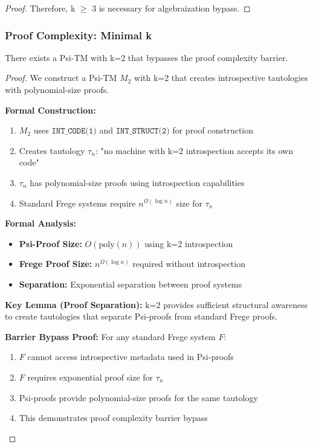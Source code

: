 \documentclass[11pt]{article}
\begin{document}
\begin{proof}
Therefore, k $\geq$ 3 is necessary for algebraization bypass.
\end{proof}

\subsubsection{Proof Complexity: Minimal k}

\begin{theorem}[Proof Complexity Bypass with k=2]
\label{thm:proof-complexity-k2}
There exists a Psi-TM with k=2 that bypasses the proof complexity barrier.
\end{theorem}

\begin{proof}
We construct a Psi-TM $M_2$ with k=2 that creates introspective tautologies with polynomial-size proofs.

\textbf{Formal Construction:}
\begin{enumerate}
\item $M_2$ uses $\texttt{INT\_CODE(1)}$ and $\texttt{INT\_STRUCT(2)}$ for proof construction
\item Creates tautology $\tau_n$: "no machine with k=2 introspection accepts its own code"
\item $\tau_n$ has polynomial-size proofs using introspection capabilities
\item Standard Frege systems require $n^{\Omega(\log n)}$ size for $\tau_n$
\end{enumerate}

\textbf{Formal Analysis:}
\begin{itemize}
\item \textbf{Psi-Proof Size:} $O(\text{poly}(n))$ using k=2 introspection
\item \textbf{Frege Proof Size:} $n^{\Omega(\log n)}$ required without introspection
\item \textbf{Separation:} Exponential separation between proof systems
\end{itemize}

\textbf{Key Lemma (Proof Separation):} k=2 provides sufficient structural awareness to create tautologies that separate Psi-proofs from standard Frege proofs.

\textbf{Barrier Bypass Proof:}
For any standard Frege system $F$:
\begin{enumerate}
\item $F$ cannot access introspective metadata used in Psi-proofs
\item $F$ requires exponential proof size for $\tau_n$
\item Psi-proofs provide polynomial-size proofs for the same tautology
\item This demonstrates proof complexity barrier bypass
\end{enumerate}
\end{proof}
\end{document}
